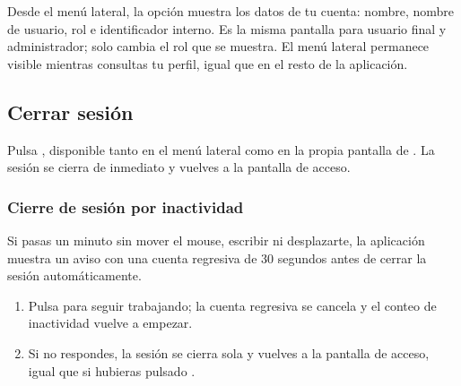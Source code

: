 Desde el menú lateral, la opción  muestra los datos de tu
cuenta: nombre, nombre de usuario, rol e identificador interno. Es la
misma pantalla para usuario final y administrador; solo cambia el rol que
se muestra. El menú lateral permanece visible mientras consultas tu
perfil, igual que en el resto de la aplicación.



\subsection{Cerrar sesión}

Pulsa , disponible tanto en el menú lateral como en la
propia pantalla de . La sesión se cierra de inmediato y
vuelves a la pantalla de acceso.

\subsubsection{Cierre de sesión por inactividad}

Si pasas un minuto sin mover el mouse, escribir ni desplazarte, la
aplicación muestra un aviso con una cuenta regresiva de 30 segundos antes
de cerrar la sesión automáticamente.


\begin{enumerate}
  \item Pulsa  para seguir trabajando; la cuenta
        regresiva se cancela y el conteo de inactividad vuelve a empezar.
  \item Si no respondes, la sesión se cierra sola y vuelves a la pantalla
        de acceso, igual que si hubieras pulsado .
\end{enumerate}

